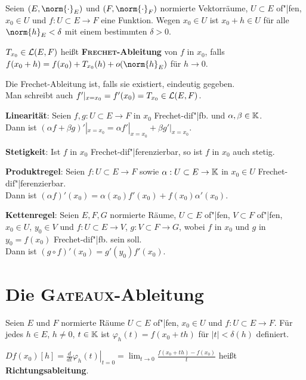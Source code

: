 Seien $(E, \norm{\cdot}_E)$ und $(F, \norm{\cdot}_F)$ normierte Vektorräume,
$U \subset E$ of"|fen, $x_0 \in U$ und $f: U \subset E \rightarrow F$
eine Funktion.
Wegen $x_0 \in U$ ist $x_0 + h \in U$ für alle $\norm{h}_E < \delta$ mit
einem bestimmten $\delta > 0$.

$T_{x_0} \in \mathcal{L}(E, F)$ heißt \textbf{\textsc{Frechet}-Ableitung} von $f$
in $x_0$, falls \\
$f(x_0 + h) = f(x_0) + T_{x_0}(h) + o(\norm{h}_E)$ für $h \to 0$.

Die Frechet-Ableitung ist, falls sie existiert, eindeutig gegeben. \\
Man schreibt auch $f'|_{x=x_0} = f'(x_0) = T_{x_0} \in \mathcal{L}(E,F)$.

\linie

\textbf{Linearität}:
Seien $f, g: U \subset E \rightarrow F$ in $x_0$ Frechet-dif"|fb.
und $\alpha, \beta \in \mathbb{K}$. \\
Dann ist
$(\alpha f + \beta g)'|_{x=x_0} = \alpha f'|_{x=x_0} + \beta g'|_{x=x_0}$.

\textbf{Stetigkeit}:
Ist $f$ in $x_0$ Frechet-dif"|ferenzierbar, so ist $f$ in $x_0$ auch stetig.

\textbf{Produktregel}:
Seien $f: U \subset E \rightarrow F$ sowie
$\alpha: U \subset E \rightarrow \mathbb{K}$ in $x_0 \in U$
Frechet-dif"|ferenzierbar. \\
Dann ist $(\alpha f)'(x_0) = \alpha(x_0) f'(x_0) + f(x_0) \alpha'(x_0)$.

\textbf{Kettenregel}:
Seien $E, F, G$ normierte Räume, $U \subset E$ of"|fen, $V \subset F$ of"|fen,
$x_0 \in U$, $y_0 \in V$ und $f: U \subset E \rightarrow V$,
$g: V \subset F \rightarrow G$, wobei $f$ in $x_0$ und $g$ in
$y_0 = f(x_0)$ Frechet-dif"|fb. sein soll. \\
Dann ist $(g \circ f)'(x_0) = g'(y_0) f'(x_0)$.

\pagebreak

\section{%
    Die \textsc{Gateaux}-Ableitung%
}

Seien $E$ und $F$ normierte Räume $U \subset E$ of"|fen, $x_0 \in U$
und $f: U \subset E \rightarrow F$.
Für jedes $h \in E$, $h \not= 0$, $t \in \mathbb{K}$ ist
$\varphi_h(t) = f(x_0 + th)$ für $|t| < \delta(h)$ definiert.

$Df(x_0)[h] = \left.\frac{d}{dt} \varphi_h(t)\right|_{t=0} =
\lim_{t \to 0} \frac{f(x_0 + th) - f(x_0)}{t}$
heißt \textbf{Richtungsableitung}.

